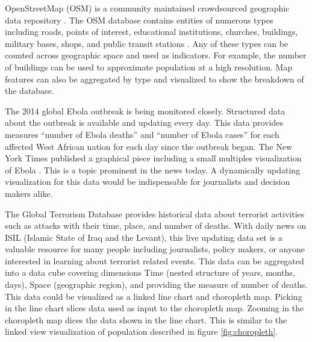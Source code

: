 OpenStreetMap (OSM) is a community maintained crowdsourced geographic data repository \cite{haklay2008openstreetmap}. The OSM database contains entities of numerous types including roads, points of interest, educational institutions, churches, buildings, military bases, shops, and public transit stations \cite{osmMapFeatures}. Any of these types can be counted across geographic space and used as indicators. For example, the number of buildings can be used to approximate population at a high resolution. Map features can also be aggregated by type and visualized to show the breakdown of the database.

The 2014 global Ebola outbreak is being monitored closely. Structured data about the outbreak is available and updating every day. This data provides measures ``number of Ebola deaths'' and ``number of Ebola cases'' for each affected West African nation for each day since the outbreak began. The New York Times published a graphical piece including a small multiples visualization of Ebola \cite{nytEbola}. This is a topic prominent in the news today. A dynamically updating visualization for this data would be indispensable for journalists and decision makers alike.

The Global Terrorism Database provides historical data about terrorist activities such as attacks with their time, place, and number of deaths. With daily news on ISIL (Islamic State of Iraq and the Levant), this live updating data set is a valuable resource for many people including journalists, policy makers, or anyone interested in learning about terrorist related events. This data can be aggregated into a data cube covering dimensions Time (nested structure of years, months, days), Space (geographic region), and providing the measure of number of deaths. This data could be visualized as a linked line chart and choropleth map. Picking in the line chart slices data used as input to the choropleth map. Zooming in the choropleth map dices the data shown in the line chart. This is similar to the linked view visualization of population described in figure \ref{fig:choropleth}.


